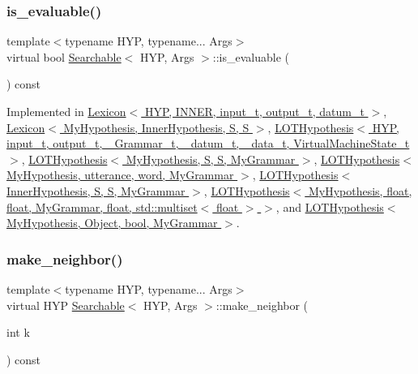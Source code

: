 \subsubsection{\texorpdfstring{is\+\_\+evaluable()}{is\_evaluable()}}
{\footnotesize\ttfamily template$<$typename H\+YP, typename... Args$>$ \\
virtual bool \hyperlink{class_searchable}{Searchable}$<$ H\+YP, Args $>$\+::is\+\_\+evaluable (\begin{DoxyParamCaption}{ }\end{DoxyParamCaption}) const\hspace{0.3cm}{\ttfamily [pure virtual]}}



Implemented in \hyperlink{class_lexicon_ab9fcefbd8598a5401a39bd59e8043db9}{Lexicon$<$ H\+Y\+P, I\+N\+N\+E\+R, input\+\_\+t, output\+\_\+t, datum\+\_\+t $>$}, \hyperlink{class_lexicon_ab9fcefbd8598a5401a39bd59e8043db9}{Lexicon$<$ My\+Hypothesis, Inner\+Hypothesis, S, S $>$}, \hyperlink{class_l_o_t_hypothesis_a9eeaaf321324d2418405f4d7252f6ca4}{L\+O\+T\+Hypothesis$<$ H\+Y\+P, input\+\_\+t, output\+\_\+t, \+\_\+\+Grammar\+\_\+t, \+\_\+datum\+\_\+t, \+\_\+data\+\_\+t, Virtual\+Machine\+State\+\_\+t $>$}, \hyperlink{class_l_o_t_hypothesis_a9eeaaf321324d2418405f4d7252f6ca4}{L\+O\+T\+Hypothesis$<$ My\+Hypothesis, S, S, My\+Grammar $>$}, \hyperlink{class_l_o_t_hypothesis_a9eeaaf321324d2418405f4d7252f6ca4}{L\+O\+T\+Hypothesis$<$ My\+Hypothesis, utterance, word, My\+Grammar $>$}, \hyperlink{class_l_o_t_hypothesis_a9eeaaf321324d2418405f4d7252f6ca4}{L\+O\+T\+Hypothesis$<$ Inner\+Hypothesis, S, S, My\+Grammar $>$}, \hyperlink{class_l_o_t_hypothesis_a9eeaaf321324d2418405f4d7252f6ca4}{L\+O\+T\+Hypothesis$<$ My\+Hypothesis, float, float, My\+Grammar, float, std\+::multiset$<$ float $>$ $>$}, and \hyperlink{class_l_o_t_hypothesis_a9eeaaf321324d2418405f4d7252f6ca4}{L\+O\+T\+Hypothesis$<$ My\+Hypothesis, Object, bool, My\+Grammar $>$}.

\mbox{\label{class_searchable_ad7fefacd3c9c2b66aa58c9d902f645cb}} 
\subsubsection{\texorpdfstring{make\+\_\+neighbor()}{make\_neighbor()}}
{\footnotesize\ttfamily template$<$typename H\+YP, typename... Args$>$ \\
virtual H\+YP \hyperlink{class_searchable}{Searchable}$<$ H\+YP, Args $>$\+::make\+\_\+neighbor (\begin{DoxyParamCaption}\item[{int}]{k }\end{DoxyParamCaption}) const\hspace{0.3cm}{\ttfamily [pure virtual]}}




